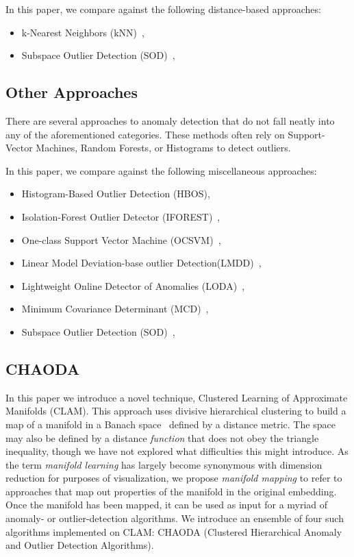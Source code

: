 In this paper, we compare against the following distance-based approaches:
\begin{itemize}
    \item k-Nearest Neighbors (kNN)~\cite{ramaswamy2000efficient, sridhar2000knn, fabrizio2002knn},
    \item Subspace Outlier Detection (SOD)~\cite{kriegel2009sod},
\end{itemize}


\subsection{Other Approaches}
\label{subsec:introduction:other-appraoches}

There are several approaches to anomaly detection that do not fall neatly into any of the aforementioned categories.
These methods often rely on Support-Vector Machines, Random Forests, or Histograms to detect outliers.

In this paper, we compare against the following miscellaneous approaches:
\begin{itemize}
    \item Histogram-Based Outlier Detection (HBOS)\cite{goldstein2012hbos},
    \item Isolation-Forest Outlier Detector (IFOREST)~\cite{tony2008iforest,tony2012iforest},
    \item One-class Support Vector Machine (OCSVM)~\cite{sholkopf2001ocsvm},
    \item Linear Model Deviation-base outlier Detection(LMDD)~\cite{arning1996lmdd},
    \item Lightweight Online Detector of Anomalies (LODA)~\cite{pevny2016loda},
    \item Minimum Covariance Determinant (MCD)~\cite{rousseeuw1999mcd,hardin2004mcd},
    \item Subspace Outlier Detection (SOD)~\cite{kriegel2009sod},
\end{itemize}


\subsection{CHAODA}
\label{subsec:introduction:chaoda}

In this paper we introduce a novel technique, Clustered Learning of Approximate Manifolds (CLAM).
This approach uses divisive hierarchical clustering to build a map of a manifold in a Banach space~\cite{banach1929fonctionnelles} defined by a distance metric.
The space may also be defined by a distance \textit{function} that does not obey the triangle inequality, though we have not explored what difficulties this might introduce.
As the term \emph{manifold learning} has largely become synonymous with dimension reduction for purposes of visualization, we propose \emph{manifold mapping} to refer to approaches that map out properties of the manifold in the original embedding.
Once the manifold has been mapped, it can be used as input for a myriad of anomaly- or outlier-detection algorithms.
We introduce an ensemble of four such algorithms implemented on CLAM: CHAODA (Clustered Hierarchical Anomaly and Outlier Detection Algorithms).

